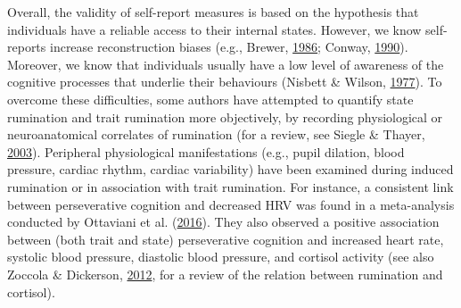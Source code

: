 \documentclass[a4paper,12pt,twoside,onecolumn,openright,final,oldfontcommands]{memoir}
\begin{document}
Overall, the validity of self-report measures is based on the hypothesis that individuals have a reliable access to their internal states. However, we know self-reports increase reconstruction biases (e.g., Brewer, \protect\hyperlink{ref-rubin_what_1986}{1986}; Conway, \protect\hyperlink{ref-conway_autobiographical_1990}{1990}). Moreover, we know that individuals usually have a low level of awareness of the cognitive processes that underlie their behaviours (Nisbett \& Wilson, \protect\hyperlink{ref-nisbett_telling_1977}{1977}). To overcome these difficulties, some authors have attempted to quantify state rumination and trait rumination more objectively, by recording physiological or neuroanatomical correlates of rumination (for a review, see Siegle \& Thayer, \protect\hyperlink{ref-papageorgiou_physiological_2003}{2003}). Peripheral physiological manifestations (e.g., pupil dilation, blood pressure, cardiac rhythm, cardiac variability) have been examined during induced rumination or in association with trait rumination. For instance, a consistent link between perseverative cognition and decreased HRV was found in a meta-analysis conducted by Ottaviani et al. (\protect\hyperlink{ref-ottaviani_physiological_2016}{2016}). They also observed a positive association between (both trait and state) perseverative cognition and increased heart rate, systolic blood pressure, diastolic blood pressure, and cortisol activity (see also Zoccola \& Dickerson, \protect\hyperlink{ref-zoccola_assessing_2012}{2012}, for a review of the relation between rumination and cortisol).
\end{document}
